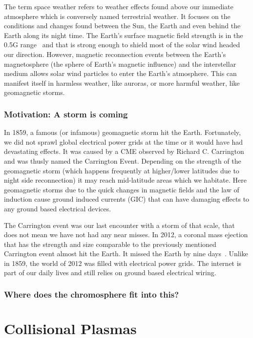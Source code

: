 \documentclass[12pt,upcase]{umlthesis}
\begin{document}
The term space weather refers to weather effects found above our immediate atmosphere which is conversely named terrestrial weather. It focuses on the conditions and changes found between the Sun, the Earth and even behind the Earth along its night time. The Earth's surface magnetic field strength is in the 0.5G range~\citep{Finlay2010} and that is strong enough to shield most of the solar wind headed our direction. However, magnetic reconnection events between the Earth's magnetosphere (the sphere of Earth's magnetic influence) and the interstellar medium allows solar wind particles to enter the Earth's atmosphere. This can manifest itself in harmless weather, like auroras, or more harmful weather, like geomagnetic storms.

\subsection{Motivation: A storm is coming}

In 1859, a famous (or infamous) geomagnetic storm hit the Earth. Fortunately, we did not sprawl global electrical power grids at the time or it would have had devastating effects. It was caused by a CME observed by Richard C. Carrington and was thusly named the Carrington Event. Depending on the strength of the geomagnetic storm (which happens frequently at higher/lower latitudes due to night side reconnection) it may reach mid-latitude areas which we habitate. Here geomagnetic storms due to the quick changes in magnetic fields and the law of induction cause ground induced currents (GIC) that can have damaging effects to any ground based electrical devices.

The Carrington event was our last encounter with a storm of that scale, that does not mean we have not had any near misses. In 2012, a coronal mass ejection that has the strength and size comparable to the previously mentioned Carrington event almost hit the Earth. It missed the Earth by nine days~\citep{Baker2013}. Unlike in 1859, the world of 2012 was filled with electrical power grids. The internet is part of our daily lives and still relies on ground based electrical wiring.



\subsection{Where does the chromosphere fit into this?}

\chapter{Collisional Plasmas}
\end{document}
